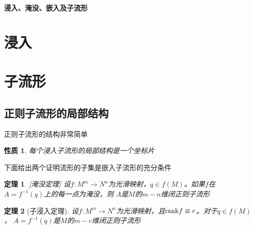 \documentclass{article}
\newtheorem{thm}{定理}[section]
\newtheorem{proposition}{性质}[section]
\begin{document}
\begin{center}
    \LARGE
    \textbf{浸入、淹没、嵌入及子流形}\\
    \vspace{0.2em}
    \large
\end{center}
\section{浸入}
\section{子流形}
\subsection{正则子流形的局部结构}
正则子流形的结构非常简单
\begin{proposition}
    每个浸入子流形的局部结构是一个坐标片
\end{proposition}
下面给出两个证明流形的子集是嵌入子流形的充分条件
\begin{thm}\label{submanifold-1}[淹没定理]
    设$f:M^{m} \to N^{n}$为光滑映射，$q \in f(M)$。如果$f$在$A=f^{-1}(q)$上的每一点为淹没，则
    $A$是$M$的$m-n$维闭正则子流形
\end{thm}
\begin{thm}[子浸入定理]
    设$f:M^{m} \to N^{n}$为光滑映射，且${\rm rank} f \equiv r$。对于$q \in f(M)$，
    $A=f^{-1}(q)$是$M$的$m-r$维闭正则子流形
\end{thm}
\end{document}
